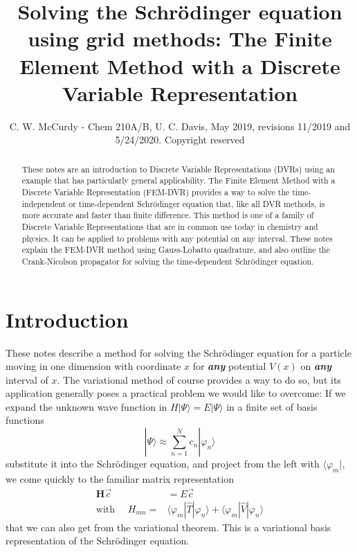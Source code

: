 \documentclass[aps,amssymb,superscriptaddress,floatfix]{revtex4}
\begin{document}
\title{Solving the Schr\"odinger equation using grid methods: The Finite Element Method with a Discrete Variable Representation} 
\author{C. W. McCurdy - Chem 210A/B, U. C. Davis, May 2019, revisions 11/2019 and 5/24/2020.  Copyright reserved}
%
\begin{abstract}
These notes are an introduction to Discrete Variable Representations  (DVRs) using an example that has particularly general applicability.   The Finite Element Method with a Discrete Variable Representation (FEM-DVR) provides a way to solve the time-independent or time-dependent Schr\"odinger equation that, like all DVR methods, is more accurate and faster than finite difference.  This method is one of a family of Discrete Variable Representations that are in common use today in chemistry and physics.  It can be applied to problems with any potential on any interval.  These notes explain the FEM-DVR method using Gauss-Lobatto quadrature, and also outline the Crank-Nicolson propagator for solving the time-dependent Schr\"odinger equation.
\end{abstract}
\maketitle
%
\section{Introduction}
These notes describe a method for solving the Schr\"odinger equation for a particle moving in one dimension with coordinate $x$ for \textbf{\textit{any}} potential $V(x)$ on \textbf{\textit{any}} interval of $x$.   The variational method of course provides a way to do so, but its application generally  poses a practical problem we would like to overcome:   If we expand the unknown wave function in $H |\Psi\rangle=E|\Psi \rangle $ in a finite set of basis functions
\begin{equation}
|\Psi \rangle \approx \sum_{n=1}^N c_n | \varphi_n \rangle
\end{equation} 
substitute it into the Schr\"odinger equation, and project from the left with $\langle \varphi_m |$, we come quickly to the familiar  matrix representation 
\begin{equation}
\begin{split}
\mathbf{H} \vec{c} &= E \vec{c} \\
\textrm{with }\quad H_{mn} =& \langle \varphi_m |\hat{T}| \varphi_n \rangle + \langle \varphi_m |\hat{V}| \varphi_n \rangle
\end{split}
\end{equation}
that we can also get from the variational theorem.  This is a variational basis representation of the Schr\"odinger equation.
\end{document}
